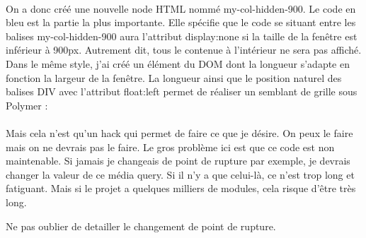 \documentclass{article}
\begin{document}
\vspace{0.5cm}\\
On a donc cr\'e\'e une nouvelle node HTML nomm\'e my-col-hidden-900. Le code en bleu est la partie la plus importante. Elle sp\'ecifie que le code se situant entre les balises \og my-col-hidden-900 \fg{} aura l'attribut \og display:none \fg{} si la taille de la fen\^etre est inf\'erieur \`a 900px. Autrement dit, tous le contenue \`a l'int\'erieur ne sera pas affich\'e.\\
Dans le m\^eme style, j'ai cr\'e\'e un \'el\'ement du DOM dont la longueur s'adapte en fonction la largeur de la fen\^etre. La longueur ainsi que le position naturel des balises DIV avec l'attribut \og float:left \fg{} permet de r\'ealiser un semblant de grille sous Polymer :
\vspace{0.5cm}\\
\vspace{0.5cm}\\


Mais cela n'est qu'un hack qui permet de faire ce que je d\'esire. On peux le faire mais on ne devrais pas le faire. Le gros probl\`eme ici est que ce code est non maintenable. Si jamais je changeais de point de rupture par exemple, je devrais changer la valeur de ce m\'edia query. Si il n'y a que celui-l\`a, ce n'est trop long et fatiguant. Mais si le projet a quelques milliers de modules, cela risque d'\^etre tr\`es long.



\newpage


Ne pas oublier de detailler le changement de point de rupture.
\end{document}
